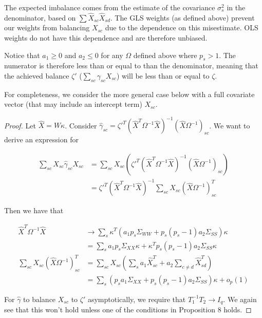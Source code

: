 \begin{remark}
    The expected imbalance comes from the estimate of the covariance $\sigma^2_s$ in the denominator, based on $\sum \hat{X}_{sc}\hat{X}_{sd}$. The GLS weights (as defined above) prevent our weights from balancing $X_{sc}$ due to the dependence on this misestimate. OLS weights do not have this dependence and are therefore unbiased.
\end{remark}

\begin{remark}
    Notice that $a_1 \ge 0$ and $a_2 \le 0$ for any $\Omega$ defined above where $p_s > 1$. The numerator is therefore less than or equal to than the denominator, meaning that the achieved balance $\zeta'$ ($\sum_{sc}\gamma_{sc}X_{sc}$) will be less than or equal to $\zeta$.
\end{remark}

For completeness, we consider the more general case below with a full covariate vector (that may include an intercept term) $X_{sc}$. 

\begin{proof}
    Let $\hat{X} = W\kappa$. Consider $\hat{\gamma}_{sc} = \zeta'^T(\hat{X}^T\Omega^{-1}\hat{X})^{-1}(\hat{X}\Omega^{-1})_{sc}$. We want to derive an expression for 
    
    \begin{align*}
        \sum_{sc}X_{sc}\hat{\gamma}_{sc}X_{sc} &= \sum_{sc}X_{sc}(\zeta'^T(\hat{X}^T\Omega^{-1}\hat{X})^{-1}(\hat{X}\Omega^{-1})_{sc}) \\ 
        &= \zeta'^T(\hat{X}^T\Omega^{-1}\hat{X})^{-1}\sum_{sc}X_{sc}(\hat{X}\Omega^{-1})_{sc}^T
    \end{align*}
    
    Then we have that
    
    \begin{align*}
        \hat{X}^T\Omega^{-1}\hat{X} &\to
        \sum_s \kappa^T(a_1p_s\Sigma_{WW} + p_s(p_s - 1)a_2\Sigma_{SS})\kappa\\
        &= \sum_s a_1p_s\Sigma_{XX}\kappa + \kappa^T p_s(p_s - 1)a_2\Sigma_{SS} \kappa  \\
        \sum_{sc}X_{sc}(\hat{X}\Omega^{-1})_{sc}^T &= \sum_{sc}X_{sc}(\sum_{s}a_{1}\hat{X}_{sc}^T + a_{2}\sum_{c\ne d}\hat{X}_{sd}^T) \\
        &= \sum_s(p_s a_1 \Sigma_{XX} + p_s(p_s - 1) a_2 \Sigma_{SS})\kappa + o_p(1)
    \end{align*}
    
    For $\hat{\gamma}$ to balance $X_{sc}$ to $\zeta'$ asymptotically, we require that $T_1^{-1}T_2 \to I_q$. We again see that this won't hold unless one of the conditions in Proposition 8 holds.
\end{proof}

